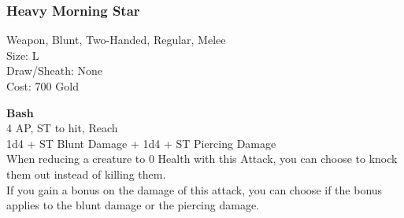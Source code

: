 \subsubsection{Heavy Morning Star}\label{weapon:heavyMorningStar}
Weapon, Blunt, Two-Handed, Regular, Melee\\
Size: L\\
Draw/Sheath: None\\
Cost: 700 Gold

\textbf{Bash}\\
4 AP, ST to hit,  Reach\\
1d4 + \texttimes ST Blunt Damage + 1d4 + \texttimes ST Piercing Damage\\
When reducing a creature to 0 Health with this Attack, you can choose to knock them out instead of killing them.\\
If you gain a bonus on the damage of this attack, you can choose if the bonus applies to the blunt damage or the piercing damage.
